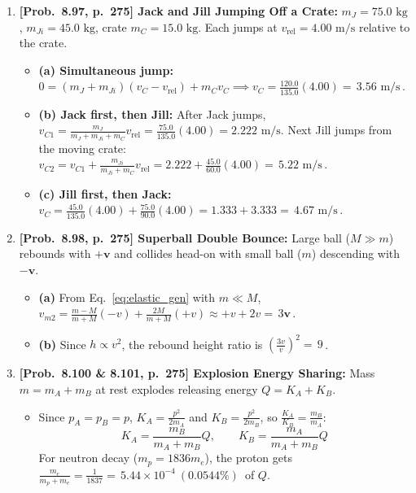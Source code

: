\documentclass[11pt,a4paper,openany,oneside]{book}
\newcommand{\eqbox}[1]{\boxed{\,#1\,}}
\newcommand{\vect}[1]{\mathbf{#1}}
\numberwithin{equation}{chapter}
\begin{document}
\begin{enumerate}[label=\textbf{Prob.\ \arabic*},leftmargin=4.2em]
  \item \textbf{[Prob.\ 8.97, p.\ 275] Jack and Jill Jumping Off a Crate:}
  $m_J = 75.0\text{ kg}$, $m_{Ji} = 45.0\text{ kg}$, crate $m_C = 15.0\text{ kg}$. Each jumps at $v_{\text{rel}} = 4.00\text{ m/s}$ relative to the crate.
  \begin{itemize}
    \item \textbf{(a) Simultaneous jump:} $0 = (m_J+m_{Ji})(v_C - v_{\text{rel}}) + m_C v_C \implies v_C = \frac{120.0}{135.0}(4.00) = \eqbox{3.56\text{ m/s}}$.
    \item \textbf{(b) Jack first, then Jill:} After Jack jumps, $v_{C1} = \frac{m_J}{m_J+m_{Ji}+m_C}v_{\text{rel}} = \frac{75.0}{135.0}(4.00) = 2.222\text{ m/s}$. Next Jill jumps from the moving crate: $v_{C2} = v_{C1} + \frac{m_{Ji}}{m_{Ji}+m_C}v_{\text{rel}} = 2.222 + \frac{45.0}{60.0}(4.00) = \eqbox{5.22\text{ m/s}}$.
    \item \textbf{(c) Jill first, then Jack:} $v_C = \frac{45.0}{135.0}(4.00) + \frac{75.0}{90.0}(4.00) = 1.333 + 3.333 = \eqbox{4.67\text{ m/s}}$.
  \end{itemize}

  \item \textbf{[Prob.\ 8.98, p.\ 275] Superball Double Bounce:}
  Large ball ($M \gg m$) rebounds with $+\vect{v}$ and collides head-on with small ball ($m$) descending with $-\vect{v}$.
  \begin{itemize}
    \item \textbf{(a)} From Eq.\ \eqref{eq:elastic_gen} with $m \ll M$, $v_{m2} = \frac{m-M}{m+M}(-v) + \frac{2M}{m+M}(+v) \approx +v + 2v = \eqbox{3\vect{v}}$.
    \item \textbf{(b)} Since $h \propto v^2$, the rebound height ratio is $\left(\frac{3v}{v}\right)^2 = \eqbox{9}$.
  \end{itemize}

  \item \textbf{[Prob.\ 8.100 \& 8.101, p.\ 275] Explosion Energy Sharing:}
  Mass $m = m_A + m_B$ at rest explodes releasing energy $Q = K_A + K_B$.
  \begin{itemize}
    \item Since $p_A = p_B = p$, $K_A = \frac{p^2}{2m_A}$ and $K_B = \frac{p^2}{2m_B}$, so $\frac{K_A}{K_B} = \frac{m_B}{m_A}$:
    \begin{equation*}
      \eqbox{K_A = \frac{m_B}{m_A + m_B}Q, \qquad K_B = \frac{m_A}{m_A + m_B}Q}
    \end{equation*}
    For neutron decay ($m_p = 1836 m_e$), the proton gets $\frac{m_e}{m_p + m_e} = \frac{1}{1837} = \eqbox{5.44\times 10^{-4}\ (0.0544\%)}$ of $Q$.
  \end{itemize}


\end{enumerate}
\end{document}
